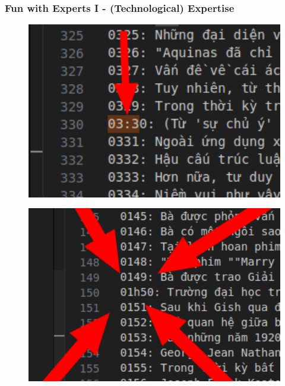 \documentclass[aspectratio=169]{beamer}
\begin{document}
\begin{frame}[fragile]
	\frametitle{Fun with Experts I - (Technological) Expertise}
    \centering
    \begin{minipage}{.40\textwidth}
        \centering
        \begin{figure}
            \includegraphics[width=1.0\textwidth]{images/MTACR_fun_with_experts_001.png} 
        \end{figure}
    \end{minipage}%
    \begin{minipage}{.40\textwidth}
        \centering
        \begin{figure}
            \includegraphics[width=1.0\textwidth]{images/MTACR_fun_with_experts_002.png} 
        \end{figure}
    \end{minipage}
    \begin{minipage}{.40\textwidth}

\end{minipage}
\end{frame}
\end{document}

